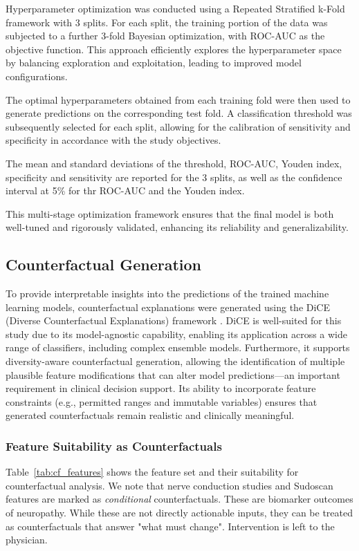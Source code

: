 \documentclass[fleqn,10pt]{wlscirep}
\begin{document}
Hyperparameter optimization was conducted using a Repeated Stratified k-Fold framework with 3 splits. For each split, the training portion of the data was subjected to a further 3-fold Bayesian optimization, with ROC-AUC as the objective function. This approach efficiently explores the hyperparameter space by balancing exploration and exploitation, leading to improved model configurations.

The optimal hyperparameters obtained from each training fold were then used to generate predictions on the corresponding test fold. A classification threshold was subsequently selected for each split, allowing for the calibration of sensitivity and specificity in accordance with the study objectives.

The mean and standard deviations of the threshold, ROC-AUC, Youden index, specificity and sensitivity are reported for the 3 splits, as well as the confidence interval at 5\% for thr ROC-AUC and the Youden index.

This multi-stage optimization framework ensures that the final model is both well-tuned and rigorously validated, enhancing its reliability and generalizability.

\subsection*{Counterfactual Generation}
To provide interpretable insights into the predictions of the trained machine learning models, counterfactual explanations were generated using the DiCE (Diverse Counterfactual Explanations) framework \cite{mothilal2020explaining}. DiCE is well-suited for this study due to its model-agnostic capability, enabling its application across a wide range of classifiers, including complex ensemble models. Furthermore, it supports diversity-aware counterfactual generation, allowing the identification of multiple plausible feature modifications that can alter model predictions—an important requirement in clinical decision support. Its ability to incorporate feature constraints (e.g., permitted ranges and immutable variables) ensures that generated counterfactuals remain realistic and clinically meaningful.

\subsubsection*{Feature Suitability as Counterfactuals}
Table~\ref{tab:cf_features} shows the feature set and their suitability for counterfactual analysis. We note that nerve conduction studies and Sudoscan features are marked as \textit{conditional} counterfactuals. These are biomarker outcomes of neuropathy. While these are not directly actionable inputs, they can be treated as counterfactuals that answer "what must change". Intervention is left to the physician. 
\end{document}

